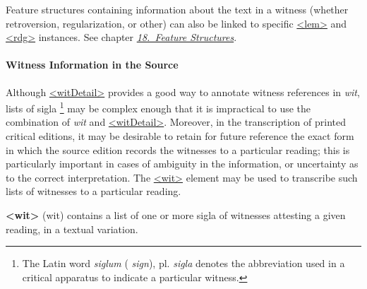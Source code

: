 Feature structures containing information about the text in a witness (whether retroversion, regularization, or other) can also be linked to specific \hyperref[TEI.lem]{<lem>} and \hyperref[TEI.rdg]{<rdg>} instances. See chapter \textit{\hyperref[FS]{18.\ Feature Structures}}.
\paragraph[{Witness Information in the Source}]{Witness Information in the Source}\label{TCSCWL}\par
Although \hyperref[TEI.witDetail]{<witDetail>} provides a good way to annotate witness references in {\itshape wit}, lists of sigla \footnote{The Latin word \textit{siglum} ( \textit{sign}), pl. \textit{sigla} denotes the abbreviation used in a critical apparatus to indicate a particular witness.} may be complex enough that it is impractical to use the combination of {\itshape wit} and \hyperref[TEI.witDetail]{<witDetail>}. Moreover, in the transcription of printed critical editions, it may be desirable to retain for future reference the exact form in which the source edition records the witnesses to a particular reading; this is particularly important in cases of ambiguity in the information, or uncertainty as to the correct interpretation. The \hyperref[TEI.wit]{<wit>} element may be used to transcribe such lists of witnesses to a particular reading. 
\begin{sansreflist}
  
\item [\textbf{<wit>}] (wit) contains a list of one or more sigla of witnesses attesting a given reading, in a textual variation.
\end{sansreflist}
